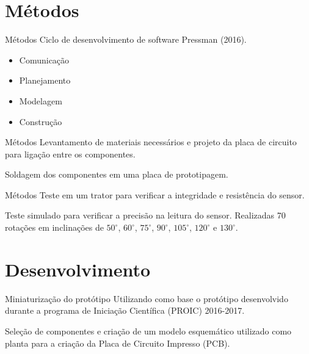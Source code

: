 \documentclass[12pt]{beamer}
\begin{document}
\section{Métodos}
\begin{frame}{Métodos}
     Ciclo de desenvolvimento de software Pressman (2016).
     \begin{itemize}
         \item Comunicação
         \item Planejamento
         \item Modelagem
         \item Construção
     \end{itemize}
\end{frame}

\begin{frame}{Métodos}
    Levantamento de materiais necessários e projeto da placa de circuito para ligação entre os componentes.
    
    Soldagem dos componentes em uma placa de prototipagem.
\end{frame}

\begin{frame}{Métodos}
   Teste em um trator para verificar a integridade e resistência do sensor.
    
   Teste simulado para verificar a precisão na leitura do sensor.
   Realizadas 70 rotações em inclinações de $50^{\circ}$, $60^{\circ}$, $75^{\circ}$, $90^{\circ}$, $105^{\circ}$, $120^{\circ}$ e $130^{\circ}$.
\end{frame}

\section{Desenvolvimento}
\begin{frame}{Miniaturização do protótipo}
    Utilizando como base o protótipo desenvolvido durante a programa de Iniciação Científica (PROIC) 2016-2017.
    
    Seleção de componentes e criação de um modelo esquemático utilizado como planta para a criação da Placa de Circuito Impresso (PCB).
\end{frame}
\end{document}
